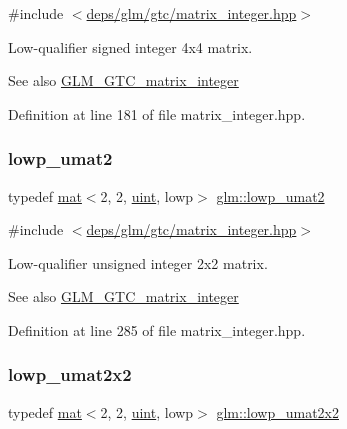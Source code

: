 {\ttfamily \#include $<$\hyperlink{matrix__integer_8hpp}{deps/glm/gtc/matrix\+\_\+integer.\+hpp}$>$}

Low-\/qualifier signed integer 4x4 matrix. \begin{DoxySeeAlso}{See also}
\hyperlink{group__gtc__matrix__integer}{G\+L\+M\+\_\+\+G\+T\+C\+\_\+matrix\+\_\+integer} 
\end{DoxySeeAlso}


Definition at line 181 of file matrix\+\_\+integer.\+hpp.

\mbox{\label{group__gtc__matrix__integer_ga51cca2e9b98db6345e8c60b7d00c79cf}} 
\subsubsection{\texorpdfstring{lowp\+\_\+umat2}{lowp\_umat2}}
{\footnotesize\ttfamily typedef \hyperlink{structglm_1_1mat}{mat}$<$2, 2, \hyperlink{group__core__precision_ga4fd29415871152bfb5abd588334147c8}{uint}, lowp$>$ \hyperlink{group__gtc__matrix__integer_ga51cca2e9b98db6345e8c60b7d00c79cf}{glm\+::lowp\+\_\+umat2}}



{\ttfamily \#include $<$\hyperlink{matrix__integer_8hpp}{deps/glm/gtc/matrix\+\_\+integer.\+hpp}$>$}

Low-\/qualifier unsigned integer 2x2 matrix. \begin{DoxySeeAlso}{See also}
\hyperlink{group__gtc__matrix__integer}{G\+L\+M\+\_\+\+G\+T\+C\+\_\+matrix\+\_\+integer} 
\end{DoxySeeAlso}


Definition at line 285 of file matrix\+\_\+integer.\+hpp.

\mbox{\label{group__gtc__matrix__integer_gafbc94510f73d2a99348be30bda37a502}} 
\subsubsection{\texorpdfstring{lowp\+\_\+umat2x2}{lowp\_umat2x2}}
{\footnotesize\ttfamily typedef \hyperlink{structglm_1_1mat}{mat}$<$2, 2, \hyperlink{group__core__precision_ga4fd29415871152bfb5abd588334147c8}{uint}, lowp$>$ \hyperlink{group__gtc__matrix__integer_gafbc94510f73d2a99348be30bda37a502}{glm\+::lowp\+\_\+umat2x2}}



